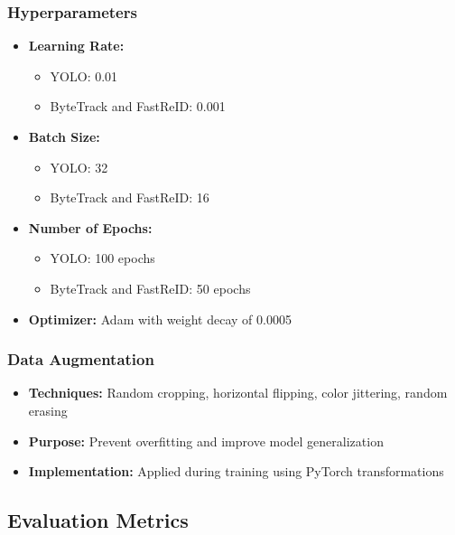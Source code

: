 \subsubsection{Hyperparameters}
\label{subsubsection:hyperparameters}

\begin{itemize}
    \item \textbf{Learning Rate:} 
    \begin{itemize}
        \item YOLO: 0.01
        \item ByteTrack and FastReID: 0.001
    \end{itemize}
    \item \textbf{Batch Size:} 
    \begin{itemize}
        \item YOLO: 32
        \item ByteTrack and FastReID: 16
    \end{itemize}
    \item \textbf{Number of Epochs:}
    \begin{itemize}
        \item YOLO: 100 epochs
        \item ByteTrack and FastReID: 50 epochs
    \end{itemize}
    \item \textbf{Optimizer:} Adam with weight decay of 0.0005
\end{itemize}

\subsubsection{Data Augmentation}
\label{subsubsection:data-augmentation}

\begin{itemize}
    \item \textbf{Techniques:} Random cropping, horizontal flipping, color jittering, random erasing
    \item \textbf{Purpose:} Prevent overfitting and improve model generalization
    \item \textbf{Implementation:} Applied during training using PyTorch transformations
\end{itemize}

\subsection{Evaluation Metrics}
\label{subsection:evaluation-metrics}

